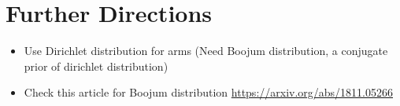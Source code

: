 \documentclass{article}
\begin{document}



\section{Further Directions}

\begin{itemize}
    \item Use Dirichlet distribution for arms (Need Boojum distribution, a conjugate prior of dirichlet distribution)
    \item Check this article for Boojum distribution \url{https://arxiv.org/abs/1811.05266}
\end{itemize}
\end{document}
